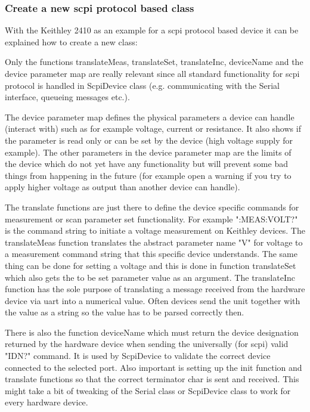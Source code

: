 \subsubsection{Create a new scpi protocol based class}
With the Keithley 2410 as an example for a scpi protocol based device it can be explained how to create a new class:
\par\bigskip
Only the functions translateMeas, translateSet, translateInc, deviceName and the device parameter map are really relevant since all standard functionality for scpi protocol is handled in ScpiDevice class (e.g. communicating with the Serial interface, queueing messages etc.).\par\bigskip
The device parameter map defines the physical parameters a device can handle (interact with) such as for example voltage, current or resistance. It also shows if the parameter is read only or can be set by the device (high voltage supply for example). The other parameters in the device parameter map are the limits of the device which do not yet have any functionality but will prevent some bad things from happening in the future (for example open a warning if you try to apply higher voltage as output than another device can handle).
\par\bigskip
The translate functions are just there to define the device specific commands for measurement or scan parameter set functionality. For example ":MEAS:VOLT?" is the command string to initiate a voltage measurement on Keithley devices. The translateMeas function translates the abstract parameter name "V" for voltage to a measurement command string that this specific device understands. The same thing can be done for setting a voltage and this is done in function translateSet which also gets the to be set parameter value as an argument. The translateInc function has the sole purpose of translating a message received from the hardware device via uart into a numerical value. Often devices send the unit together with the value as a string so the value has to be parsed correctly then.
\newpage

\par\bigskip
There is also the function deviceName which must return the device designation returned by the hardware device when sending the universally (for scpi) valid "IDN?" command. It is used by ScpiDevice to validate the correct device connected to the selected port. Also important is setting up the init function and translate functions so that the correct terminator char is sent and received. This might take a bit of tweaking of the Serial class or ScpiDevice class to work for every hardware device.
\newpage
